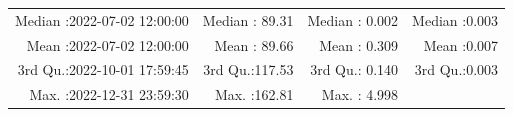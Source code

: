 \documentclass[
  10pt,
  a4paper,oneside]{article}
\begin{document}
\begin{longtable}[]{@{}rrrr@{}}
\begin{minipage}[t]{0.33\columnwidth}\raggedleft
Median :2022-07-02 12:00:00\strut
\end{minipage} & \begin{minipage}[t]{0.19\columnwidth}\raggedleft
Median : 89.31\strut
\end{minipage} & \begin{minipage}[t]{0.19\columnwidth}\raggedleft
Median : 0.002\strut
\end{minipage} & \begin{minipage}[t]{0.19\columnwidth}\raggedleft
Median :0.003\strut
\end{minipage}\tabularnewline
\begin{minipage}[t]{0.33\columnwidth}\raggedleft
Mean :2022-07-02 12:00:00\strut
\end{minipage} & \begin{minipage}[t]{0.19\columnwidth}\raggedleft
Mean : 89.66\strut
\end{minipage} & \begin{minipage}[t]{0.19\columnwidth}\raggedleft
Mean : 0.309\strut
\end{minipage} & \begin{minipage}[t]{0.19\columnwidth}\raggedleft
Mean :0.007\strut
\end{minipage}\tabularnewline
\begin{minipage}[t]{0.33\columnwidth}\raggedleft
3rd Qu.:2022-10-01 17:59:45\strut
\end{minipage} & \begin{minipage}[t]{0.19\columnwidth}\raggedleft
3rd Qu.:117.53\strut
\end{minipage} & \begin{minipage}[t]{0.19\columnwidth}\raggedleft
3rd Qu.: 0.140\strut
\end{minipage} & \begin{minipage}[t]{0.19\columnwidth}\raggedleft
3rd Qu.:0.003\strut
\end{minipage}\tabularnewline
\begin{minipage}[t]{0.33\columnwidth}\raggedleft
Max. :2022-12-31 23:59:30\strut
\end{minipage} & \begin{minipage}[t]{0.19\columnwidth}\raggedleft
Max. :162.81\strut
\end{minipage} & \begin{minipage}[t]{0.19\columnwidth}\raggedleft
Max. : 4.998\strut
\end{minipage} & \begin{minipage}[t]{0.19\columnwidth}\raggedleft

\end{minipage}
\end{longtable}
\end{document}
